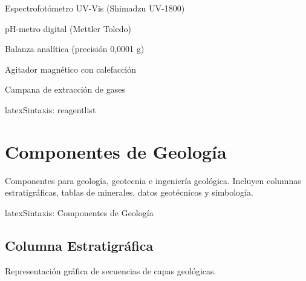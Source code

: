 \begin{equipmentlist}
  \item Espectrofotómetro UV-Vis (Shimadzu UV-1800)
  \item pH-metro digital (Mettler Toledo)
  \item Balanza analítica (precisión 0,0001 g)
  \item Agitador magnético con calefacción
  \item Campana de extracción de gases
\end{equipmentlist}


\begin{codigosimple}{latex}{Sintaxis: reagentlist}
\begin{reagentlist}
\end{reagentlist}
\end{codigosimple}

\begin{reagentlist}
\end{reagentlist}


\section{Componentes de Geología}
\label{sec:comp-geologia}

Componentes para geología, geotecnia e ingeniería geológica. Incluyen
columnas estratigráficas, tablas de minerales, datos geotécnicos y simbología.

\begin{codigosimple}{latex}{Sintaxis: Componentes de Geología}
\usepackage[geologia]{eps-componentes}
\end{codigosimple}

\subsection{Columna Estratigráfica}
\label{subsec:estratigrafia}

Representación gráfica de secuencias de capas geológicas.

